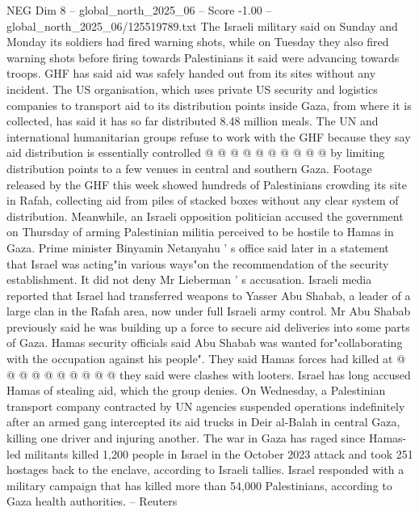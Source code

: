 \begin{textsample}{NEG Dim 8 – global\_north\_2025\_06 – Score -1.00 – global\_north\_2025\_06/125519789.txt}
The Israeli military said on Sunday and Monday its soldiers had fired warning shots, while on Tuesday they also fired warning shots before firing towards Palestinians it said were advancing towards troops.
GHF has said aid was safely handed out from its sites without any incident.
The US organisation, which uses private US security and logistics companies to transport aid to its distribution points inside Gaza, from where it is collected, has said it has so far distributed 8.48 million meals.
The UN and international humanitarian groups refuse to work with the GHF because they say aid distribution is essentially controlled @ @ @ @ @ @ @ @ @ @ by limiting distribution points to a few venues in central and southern Gaza.
Footage released by the GHF this week showed hundreds of Palestinians crowding its site in Rafah, collecting aid from piles of stacked boxes without any clear system of distribution.
Meanwhile, an Israeli opposition politician accused the government on Thursday of arming Palestinian militia perceived to be hostile to Hamas in Gaza.
Prime minister Binyamin Netanyahu ' s office said later in a statement that Israel was acting"in various ways"on the recommendation of the security establishment.
It did not deny Mr Lieberman ' s accusation.
Israeli media reported that Israel had transferred weapons to Yasser Abu Shabab, a leader of a large clan in the Rafah area, now under full Israeli army control.
Mr Abu Shabab previously said he was building up a force to secure aid deliveries into some parts of Gaza.
Hamas security officials said Abu Shabab was wanted for"collaborating with the occupation against his people".
They said Hamas forces had killed at @ @ @ @ @ @ @ @ @ @ they said were clashes with looters.
Israel has long accused Hamas of stealing aid, which the group denies.
On Wednesday, a Palestinian transport company contracted by UN agencies suspended operations indefinitely after an armed gang intercepted its aid trucks in Deir al-Balah in central Gaza, killing one driver and injuring another.
The war in Gaza has raged since Hamas-led militants killed 1,200 people in Israel in the October 2023 attack and took 251 hostages back to the enclave, according to Israeli tallies.
Israel responded with a military campaign that has killed more than 54,000 Palestinians, according to Gaza health authorities. -- Reuters

\end{textsample}
